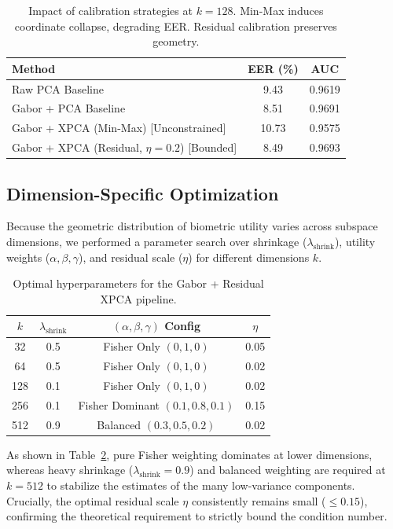 \documentclass[conference]{IEEEtran}
\begin{document}
\begin{table}[t]
\centering
\caption{Impact of calibration strategies at $k=128$. Min-Max induces coordinate collapse, degrading EER. Residual calibration preserves geometry.}
\label{tab:calibration_initial}
\begin{tabular}{@{}lcc@{}}
\toprule
\textbf{Method} & \textbf{EER (\%)} & \textbf{AUC} \\
\midrule
Raw PCA Baseline & 9.43 & 0.9619 \\
Gabor + PCA Baseline & 8.51 & 0.9691 \\
Gabor + XPCA (Min-Max) [Unconstrained] & 10.73 & 0.9575 \\
Gabor + XPCA (Residual, $\eta=0.2$) [Bounded] & 8.49 & 0.9693 \\
\bottomrule
\end{tabular}
\end{table}

\subsection{Dimension-Specific Optimization}
Because the geometric distribution of biometric utility varies across subspace dimensions, we performed a parameter search over shrinkage ($\lambda_{\text{shrink}}$), utility weights ($\alpha, \beta, \gamma$), and residual scale ($\eta$) for different dimensions $k$. 

\begin{table}[t]
\centering
\caption{Optimal hyperparameters for the Gabor + Residual XPCA pipeline.}
\label{tab:optimal_configs}
\begin{tabular}{@{}cccc@{}}
\toprule
\textbf{$k$} & \textbf{$\lambda_{\text{shrink}}$} & \textbf{$(\alpha, \beta, \gamma)$ Config} & \textbf{$\eta$} \\
\midrule
32  & 0.5 & Fisher Only $(0, 1, 0)$     & 0.05 \\
64  & 0.5 & Fisher Only $(0, 1, 0)$     & 0.02 \\
128 & 0.1 & Fisher Only $(0, 1, 0)$     & 0.02 \\
256 & 0.1 & Fisher Dominant $(0.1, 0.8, 0.1)$ & 0.15 \\
512 & 0.9 & Balanced $(0.3, 0.5, 0.2)$  & 0.02 \\
\bottomrule
\end{tabular}
\end{table}

As shown in Table~\ref{tab:optimal_configs}, pure Fisher weighting dominates at lower dimensions, whereas heavy shrinkage ($\lambda_{\text{shrink}} = 0.9$) and balanced weighting are required at $k=512$ to stabilize the estimates of the many low-variance components. Crucially, the optimal residual scale $\eta$ consistently remains small ($\leq 0.15$), confirming the theoretical requirement to strictly bound the condition number.
\end{document}
